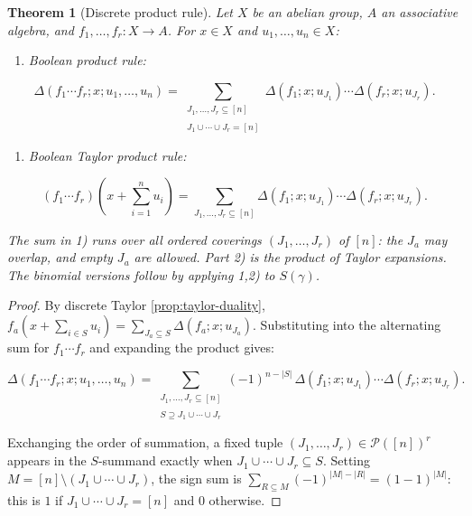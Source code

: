 \documentclass[10pt,a4paper]{article}
\theoremstyle{plain}
\newtheorem{theorem}{Theorem}
\theoremstyle{definition}
\newcommand{\1}{\mathbb{1}} %
\newcommand{\KP}{\mathcal{P}}
\newcommand{\tightlist}{\setlength{\itemsep}{0pt}\setlength{\parskip}{0pt}}
\begin{document}
\begin{theorem}[Discrete product rule]

\label{thm:product-rule} Let \(X\) be an abelian group, \(A\) an
associative algebra, and \(f_1,\dots,f_r: X \to A\). For \(x \in X\) and
\(u_1,\dots,u_n \in X\):

\begin{enumerate}
\def\labelenumi{\arabic{enumi})}
\tightlist
\item
  \emph{Boolean product rule:}
\end{enumerate}

\[
  \Delta(f_1 \cdots f_r; x; u_1,\dots,u_n)
  =
  \sum_{\substack{J_1,\dots,J_r \subseteq [n] \\\\ J_1 \cup \cdots \cup J_r = [n]}}
  \Delta(f_1; x; u_{J_1}) \cdots \Delta(f_r; x; u_{J_r}).
\]

\begin{enumerate}
\def\labelenumi{\arabic{enumi})}
\setcounter{enumi}{1}
\tightlist
\item
  \emph{Boolean Taylor product rule:}
\end{enumerate}

\[
  (f_1 \cdots f_r)(x + {\textstyle\sum_{i=1}^n} u_i)
  =
  \sum_{J_1, \dots, J_r \subseteq [n]}
  \Delta(f_1; x; u_{J_1}) \cdots \Delta(f_r; x; u_{J_r}).
\]

The sum in 1) runs over all \emph{ordered coverings} \((J_1,\dots,J_r)\)
of \([n]\): the \(J_a\) may overlap, and empty \(J_a\) are allowed. Part
2) is the product of Taylor expansions. The binomial versions follow by
applying 1,2) to \(S(\gamma)\).

\end{theorem}

\begin{proof}

By discrete Taylor \ref{prop:taylor-duality},
\(f_a(x + \sum_{i \in S} u_i) = \sum_{J_a \subseteq S} \Delta(f_a; x; u_{J_a})\).
Substituting into the alternating sum for \(f_1 \cdots f_r\) and
expanding the product gives:

\[
  \Delta(f_1 \cdots f_r; x; u_1, \dots, u_n)
  =
  \sum_{\substack{J_1, \dots, J_r \subseteq [n] \\\\ S \supseteq J_1 \cup \cdots \cup J_r}}
  (-1)^{n-|S|}\,
  \Delta(f_1; x; u_{J_1}) \cdots \Delta(f_r; x; u_{J_r}).
\]

Exchanging the order of summation, a fixed tuple
\((J_1, \dots, J_r) \in \KP([n])^r\) appears in the \(S\)-summand
exactly when \(J_1 \cup \cdots \cup J_r \subseteq S\). Setting
\(M = [n] \setminus (J_1 \cup \cdots \cup J_r)\), the sign sum is
\(\sum_{R \subseteq M} (-1)^{|M|-|R|} = (1-1)^{|M|}\): this is \(1\) if
\(J_1 \cup \cdots \cup J_r = [n]\) and \(0\) otherwise.

\end{proof}
\end{document}
